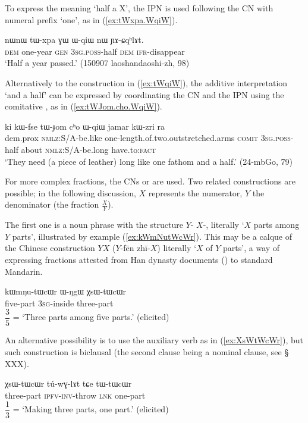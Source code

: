 To express the meaning `half a X', the IPN  is used following the CN with numeral prefix `one', as in (\ref{ex:tWxpa.WqiW}).

\begin{exe}
\ex \label{ex:tWxpa.WqiW}
 \gll nɯnɯ tɯ-xpa ɣɯ ɯ-qiɯ nɯ ɲɤ-ɕqʰlɤt. \\
\textsc{dem} one-year \textsc{gen} \textsc{3sg}.\textsc{poss}-half \textsc{dem} \textsc{ifr}-disappear \\
\glt  `Half a year passed.' (150907 laoshandaoshi-zh, 98)
\end{exe}

Alternatively to the construction in (\ref{ex:tWqiW}), the additive interpretation  `and a half' can be expressed by coordinating the CN and the IPN  using the comitative , as in (\ref{ex:tWJom.cho.WqiW}).

\begin{exe}
\ex \label{ex:tWJom.cho.WqiW}
 \gll ki kɯ-fse tɯ-ɟom cʰo ɯ-qiɯ jamar kɯ-zri ra \\
 dem.prox \textsc{nmlz}:S/A-be.like one-length.of.two.outstretched.arms \textsc{comit} \textsc{3sg}.\textsc{poss}-half about \textsc{nmlz}:S/A-be.long have.to:\textsc{fact} \\
\glt `They need (a piece of leather) long like one fathom and a half.' (24-mbGo, 79)
\end{exe}

For more complex fractions, the CNs  or  are used. Two related constructions are possible; in the following discussion, $X$ represents the numerator, $Y$ the denominator (the fraction $\frac{X}{Y}$). 

The first one is a noun phrase with the structure $Y$-  $X$-, literally `$X$ parts among $Y$ parts', illustrated by example (\ref{ex:kWmNutWcWr}). This may be a calque of the Chinese construction $Y$$X$ 
($Y$-fēn zhī-$X$) literally `$X$ of $Y$ parts', a way of expressing fractions attested from Han dynasty documents (\citealt{anicotte15fractions}) to standard Mandarin.
 
\begin{exe}
\ex \label{ex:kWmNutWcWr}
 \gll kɯmŋu-tɯcɯr ɯ-ŋgɯ χsɯ-tɯcɯr  \\
 five-part \textsc{3sg}-inside three-part \\
 \glt $\dfrac{3}{5}$ = `Three parts among five parts.' (elicited)
\end{exe}

An alternative possibility is to use the auxiliary verb  as in (\ref{ex:XsWtWcWr}), but such construction is biclausal (the second clause being a nominal clause, see § XXX).

\begin{exe}
\ex \label{ex:XsWtWcWr}
 \gll χsɯ-tɯcɯr tú-wɣ-lɤt tɕe tɯ-tɯcɯr   \\
 three-part \textsc{ipfv}-\textsc{inv}-throw \textsc{lnk} one-part \\
 \glt $\dfrac{1}{3}$ = `Making three parts, one part.' (elicited)
\end{exe}
